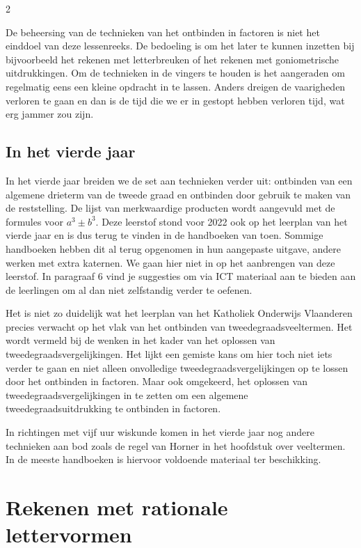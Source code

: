 \begin{multicols}{2}
   
De beheersing van de technieken van het ontbinden in factoren is niet het einddoel van deze lessenreeks. De bedoeling is om het later te kunnen inzetten bij bijvoorbeeld het rekenen met letterbreuken of het rekenen met goniometrische uitdrukkingen. Om de technieken in de vingers te houden is het aangeraden om regelmatig eens een kleine opdracht in te lassen. Anders dreigen de vaarigheden verloren te gaan en dan is de tijd die we er in gestopt hebben verloren tijd, wat erg jammer zou zijn.


\subsection{In het vierde jaar}

In het vierde jaar breiden we de set aan technieken verder uit: ontbinden van een algemene drieterm van de tweede graad en ontbinden door gebruik te maken van de reststelling. De lijst van merkwaardige producten wordt aangevuld met de formules voor $a^3 \pm b^3$. Deze leerstof stond voor 2022 ook op het leerplan van het vierde jaar en is dus terug te vinden in de handboeken van toen. Sommige handboeken hebben dit al terug opgenomen in hun aangepaste uitgave, andere werken met extra katernen. We gaan hier niet in op het aanbrengen van deze leerstof. In paragraaf 6 vind je suggesties om via ICT materiaal aan te bieden aan de leerlingen om al dan niet zelfstandig verder te oefenen. 

Het is niet zo duidelijk wat het leerplan van het Katholiek Onderwijs Vlaanderen precies verwacht op het vlak van het ontbinden van tweedegraadsveeltermen. Het wordt vermeld bij de wenken in het kader van het oplossen van tweedegraadsvergelijkingen. Het lijkt een gemiste kans om hier toch niet iets verder te gaan en niet alleen onvolledige tweedegraadsvergelijkingen op te lossen door het ontbinden in factoren. Maar ook omgekeerd, het oplossen van tweedegraadsvergelijkingen in te zetten om een algemene tweedegraadsuitdrukking te ontbinden in factoren. 

In richtingen met vijf uur wiskunde komen in het vierde jaar nog andere technieken aan bod zoals de regel van Horner in het hoofdstuk over veeltermen. In de meeste handboeken is hiervoor voldoende materiaal ter beschikking.

	
\section{Rekenen met rationale lettervormen}



\end{multicols}
